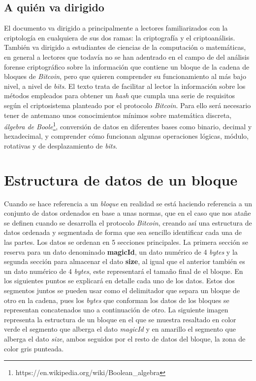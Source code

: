 \documentclass{article}
\begin{document}
    \subsection{A quién va dirigido}
    El documento va dirigido a principalmente a lectores familiarizados con la criptología en cualquiera de sus dos ramas: la criptografía y el criptoanálisis. También va dirigido a estudiantes de ciencias de la computación o matemáticas, en general a lectores que todavía no se han adentrado en el campo de del análisis forense criptográfico sobre la información que contiene un bloque de la cadena de bloques de \textit{Bitcoin}, pero que quieren comprender su funcionamiento al más bajo nivel, a nivel de \textit{bits}. El texto trata de facilitar al lector la información sobre los métodos empleados para obtener un \textit{hash} que cumpla una serie de requisitos según el criptosistema planteado por el protocolo \textit{Bitcoin}. Para ello será necesario tener de antemano unos conocimientos mínimos sobre matemática discreta, \textit{álgebra de Boole}\footnote{https://en.wikipedia.org/wiki/Boolean\_algebra}, conversión de datos en diferentes bases como binario, decimal y hexadecimal, y comprender cómo funcionan algunas operaciones lógicas, módulo, rotativas y de desplazamiento de \textit{bits}.

\section{Estructura de datos de un bloque}
    
    \vspace{3mm}
    
    Cuando se hace referencia a un \textit{bloque} en realidad se está haciendo referencia a un conjunto de datos ordenados en base a unas normas, que en el caso que nos atañe se definen cuando se desarrolla el protocolo \textit{Bitcoin}, creando así una estructura de datos ordenada y segmentada de forma que sea sencillo identificar cada una de las partes. Los datos se ordenan en 5 secciones principales. La primera sección se reserva para un dato denominado \textbf{magicId}, un dato numérico de 4 \textit{bytes} y la segunda sección para almacenar el dato \textbf{size}, al igual que el anterior también es un dato numérico de 4 \textit{bytes}, este representará el tamaño final de el bloque. En los siguientes puntos se explicará en detalle cada uno de los datos. Estos dos segmentos juntos se pueden usar como el delimitador que separa un bloque de otro en la cadena, pues los \textit{bytes} que conforman los datos de los bloques se representan concatenados uno a continuación de otro. La siguiente imagen representa la estructura de un bloque en el que se muestra resaltado en color verde el segmento que alberga el dato \textit{magicId} y en amarillo el segmento que alberga el dato \textit{size}, ambos seguidos por el resto de datos del bloque, la zona de color gris punteada.
    
\end{document}
